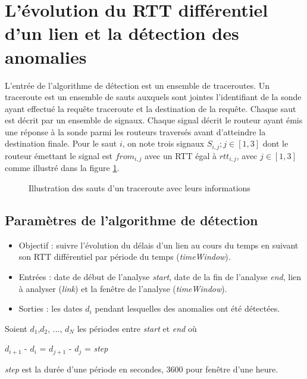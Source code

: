 \section{L'évolution du RTT différentiel d'un lien et  la détection des anomalies} \label{rttevolution}


L'entrée de l'algorithme de détection est un ensemble de traceroutes. Un traceroute  est un ensemble de sauts auxquels sont jointes l'identifiant de la sonde ayant effectué la requête traceroute et la destination de la requête. Chaque saut est décrit par un ensemble de signaux.  Chaque signal décrit le routeur ayant émis une réponse à la sonde parmi les routeurs traversés avant d'atteindre la destination finale.  Pour le saut $i$, on note trois signaux $S_{i, j}; j\in [1,3]$ dont le routeur émettant le signal est $from_{i,j}$ avec un RTT égal à $rtt_{i,j}$, avec $j \in [1,3]$ comme illustré dans la figure \ref{fig:traceroute}.

\begin{figure}[H]
	\centering
	\resizebox{\textwidth}{!}{
	
}
	\caption{Illustration des sauts d'un traceroute avec leurs informations}
	\label{fig:traceroute}
\end{figure}

\subsection{Paramètres de l'algorithme de  détection}

\begin{itemize}
		\item  Objectif : suivre l'évolution du délais d'un lien au cours du temps en suivant son RTT différentiel par période du temps (\textit{timeWindow}).
	\item Entrées : date de début de l'analyse \textit{start}, date de la fin de l'analyse \textit{end}, lien à analyser (\textit{link}) et la fenêtre de l'analyse (\textit{timeWindow}).
	\item Sorties : les dates $d_i$ pendant lesquelles des anomalies ont été détectées.
\end{itemize}

Soient $ d_1 $,$  d_2 $, ..., $ d_N $ les périodes entre \textit{start} et \textit{end} où

\begin{center}
	 $  d_{i+1} $ - $  d_{i} $ = $  d_{j+1} $ - $  d_{j} $ = \textit{step} 
	 
	 \textit{step} est la durée d'une période en secondes, $3600$ pour fenêtre d'une heure.
\end{center}
 
